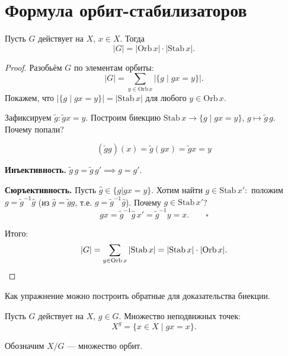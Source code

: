 \section{Формула орбит-стабилизаторов}

\begin{stmt}
    Пусть $G$ действует на $X$, $x \in X$. Тогда
    \[
        |G| = |\mathrm{Orb}\, x| \cdot |\mathrm{Stab}\, x|.
    \]
    \begin{proof}
        Разобьём $G$ по элементам орбиты:
        \[
            |G| = \sum_{y \in \mathrm{Orb}\, x} |\{g \mid gx = y\}|.
        \]
        Покажем, что $|\{g \mid gx = y\}| = |\mathrm{Stab}\, x|$ для любого $y \in \mathrm{Orb}\, x$.

        Зафиксируем $\tilde{g}\colon \tilde{g}x = y$. Построим биекцию $\mathrm{Stab}\, x \to \{g \mid gx = y\}$, $g \mapsto \tilde{g}\, g$.
        Почему попали?

        \[
            (\tilde{g} g)(x) = \tilde{g}(gx) = \tilde{g}x = y
        \]

        \textbf{Инъективность.} $\tilde{g}\, g = \tilde{g}\, g' \implies g = g'$.

        \textbf{Сюръективность.} Пусть $\hat{g} \in \{g | gx = y\}$.
        Хотим найти $g \in \mathrm{Stab}\, x'\colon$ положим $g = \tilde{g}^{-1}\hat{g}$
        (из $\hat{g} = \tilde{g}g$, т.е. $g = \tilde{g}^{-1}\hat{g}$).
        Почему $g \in \mathrm{Stab}\, x'$?
        \[
            gx = \tilde{g}^{-1}\hat{g}\, x' = \tilde{g}^{-1} y = x. \qquad \square
        \]

        Итого:
        \[
            |G| = \sum_{y \in \mathrm{Orb}\, x} |\mathrm{Stab}\, x| = |\mathrm{Stab}\, x| \cdot |\mathrm{Orb}\, x|. \qedhere
        \]
    \end{proof}
\end{stmt}


\begin{remark}
    Как упражнение можно построить обратные для доказательства биекции.
\end{remark}



\begin{definition}
    Пусть $G$ действует на $X$, $g \in G$. Множество неподвижных точек:
    \[
        X^g = \{x \in X \mid gx = x\}.
    \]
\end{definition}

\begin{definition}
Обозначим $X / G$ --- множество орбит.
\end{definition}


